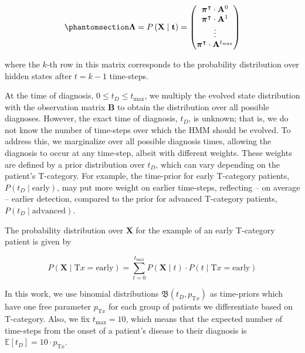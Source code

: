 \documentclass[
  sn-mathphys-num,
]{sn-jnl}
\begin{document}
\begin{equation}\phantomsection\label{eq-lambda-matrix}{
\boldsymbol{\Lambda} = P \left( \mathbf{X} \mid \mathbf{t} \right) = \begin{pmatrix}
\boldsymbol{\pi}^\intercal \cdot \mathbf{A}^0 \\
\boldsymbol{\pi}^\intercal \cdot \mathbf{A}^1 \\
\vdots \\
\boldsymbol{\pi}^\intercal \cdot \mathbf{A}^{t_\text{max}} \\
\end{pmatrix}
}\end{equation}

where the \(k\)-th row in this matrix corresponds to the probability
distribution over hidden states after \(t=k-1\) time-steps.

At the time of diagnosis, \(0 \leq t_D \leq t_\text{max}\), we multiply
the evolved state distribution with the observation matrix
\(\mathbf{B}\) to obtain the distribution over all possible diagnoses.
However, the exact time of diagnosis, \(t_D\), is unknown; that is, we
do not know the number of time-steps over which the HMM should be
evolved. To address this, we marginalize over all possible diagnosis
times, allowing the diagnosis to occur at any time-step, albeit with
different weights. These weights are defined by a prior distribution
over \(t_D\), which can vary depending on the patient's T-category. For
example, the time-prior for early T-category patients,
\(P(t_D \mid \text{early})\), may put more weight on earlier time-steps,
reflecting -- on average -- earlier detection, compared to the prior for
advanced T-category patients, \(P(t_D \mid \text{advanced})\).

The probability distribution over \(\mathbf{X}\) for the example of an
early T-category patient is given by

\[
P\left( \mathbf{X} \mid \text{T}x = \text{early} \right) = \sum_{t=0}^{t_\text{max}} P \left( \mathbf{X} \mid t \right) \cdot P(t \mid \text{T}x = \text{early})
\]

In this work, we use binomial distributions
\(\mathfrak{B} \left( t_D, p_{\text{T}x} \right)\) as time-priors which
have one free parameter \(p_{\text{T}x}\) for each group of patients we
differentiate based on T-category. Also, we fix \(t_\text{max} = 10\),
which means that the expected number of time-steps from the onset of a
patient's disease to their diagnosis is
\(\mathbb{E}\left[ t_D \right] = 10 \cdot p_{\text{T}x}\).
\end{document}
